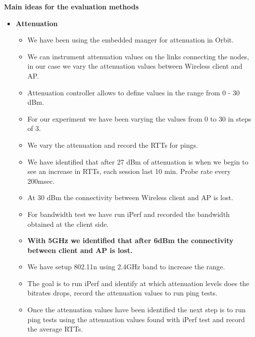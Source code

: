 \textbf{Main ideas for the evaluation methods}

\begin{itemize}
	\item \textbf{Attenuation}
	\begin{itemize}
		\item We have been using the embedded manger for attenuation in Orbit.
		\item We can instrument attenuation values on the links connecting the nodes, in our case we vary the attenuation values between Wireless client and AP.
		\item Attenuation controller allows to define values in the range from 0 - 30 dBm.
		\item For our experiment we have been varying the values from 0 to 30 in steps of 3.
		\item We vary the attenuation and record the RTTs for pings.
		\item We have identified that after 27 dBm of attenuation is when we begin to see an increase in RTTs, each session last 10 min. Probe rate every 200msec.
		\item At 30 dBm the connectivity between Wireless client and AP is lost.
		\item For bandwidth test we have run iPerf and recorded the bandwidth obtained at the client side.
		\item \textbf{With 5GHz we identified that after 6dBm the connectivity between client and AP is lost.}
		\item We have setup 802.11n using 2.4GHz band to increase the range.
		\item The goal is to run iPerf and identify at which attenuation levels does the bitrates drops, record the attenuation values to run ping tests.
		\item Once the attenuation values have been identified the next step is to run ping tests using the attenuation values found with iPerf test and record the average RTTs.
		
	\end{itemize}

	

\end{itemize}
